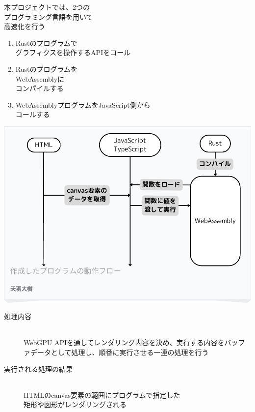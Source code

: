 \begin{minipage}[t]{0.4\textwidth}\vspace{0pt}
本プロジェクトでは、2つの\\プログラミング言語を用いて\\高速化を行う

\begin{enumerate}[parsep=-0.5\zh]
	\item Rustのプログラムで\\グラフィクスを操作するAPIをコール
	\item Rustのプログラムを\\WebAssemblyに\\コンパイルする
	\item WebAssemblyプログラムをJavaScript側から\\コールする
\end{enumerate}
\end{minipage}
\begin{minipage}[t]{0.6\textwidth}\vspace{0pt}
\begin{center}
\includegraphics[keepaspectratio, width=.9\linewidth,trim={0mm 0mm 0mm 0mm},clip]{fig/system.pdf}
\end{center}
\end{minipage}

\begin{description}

	\item[処理内容]~\\
	WebGPU APIを通してレンダリング内容を決め、実行する内容をバッファデータとして処理し、順番に実行させる一連の処理を行う
	\item[実行される処理の結果]~\\
	HTMLのcanvas要素の範囲にプログラムで指定した\\矩形や図形がレンダリングされる

\end{description}
\newpage

